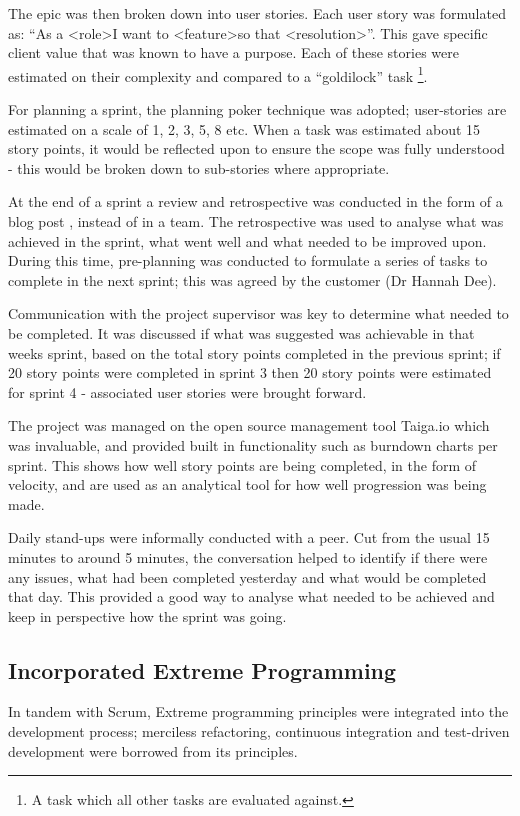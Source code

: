 The epic was then broken down into user stories. Each user story was formulated as: ``As a \textless role\textgreater I want to \textless feature\textgreater so that \textless resolution\textgreater''. This gave specific client value that was known to have a purpose. Each of these stories were estimated on their complexity and compared to a ``goldilock'' task \footnote{A task which all other tasks are evaluated against.}.

For planning a sprint, the planning poker \cite{citeulike:14014357} technique was adopted; user-stories are estimated on a scale of 1, 2, 3, 5, 8 etc. When a task was estimated about 15 story points, it would be reflected upon to ensure the scope was fully understood - this would be broken down to sub-stories where appropriate.

At the end of a sprint a review and retrospective was conducted in the form of a blog post \cite{citeulike:14014367}, instead of in a team. The retrospective was used to analyse what was achieved in the sprint, what went well and what needed to be improved upon. During this time, pre-planning was conducted to formulate a series of tasks to complete in the next sprint; this was agreed by the customer (Dr Hannah Dee).

Communication with the project supervisor was key to determine what needed to be completed. It was discussed if what was suggested was achievable in that weeks sprint, based on the total story points completed in the previous sprint; if 20 story points were completed in sprint 3 then 20 story points were estimated for sprint 4 - associated user stories were brought forward.

The project was managed on the open source management tool Taiga.io \cite{citeulike:14014360} which was invaluable, and provided built in functionality such as burndown charts per sprint. This shows how well story points are being completed, in the form of velocity, and are used as an analytical tool for how well progression was being made.

Daily stand-ups were informally conducted with a peer. Cut from the usual 15 minutes to around 5 minutes, the conversation helped to identify if there were any issues, what had been completed yesterday and what would be completed that day. This provided a good way to analyse what needed to be achieved and keep in perspective how the sprint was going.

\subsection{Incorporated Extreme Programming}
In tandem with Scrum, Extreme programming \cite{citeulike:13915786} principles were integrated into the development process; merciless refactoring, continuous integration and test-driven development were borrowed from its principles.

